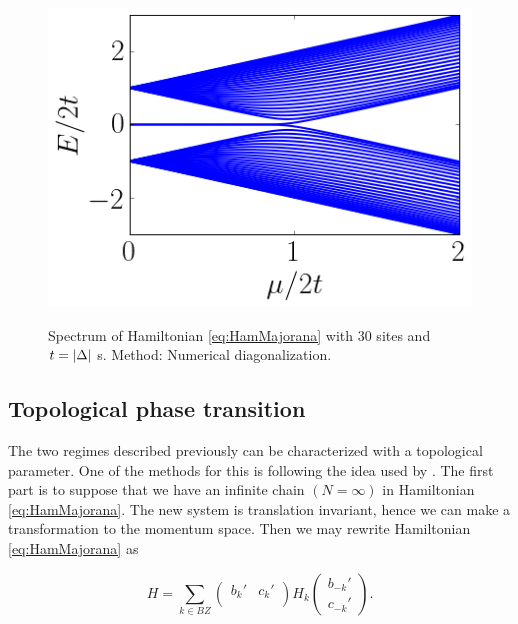 \begin{figure}[t]
    \centering
    \includegraphics[scale=0.65]{IMAGES/Majorana/Spectrum.png}
    \label{fig:KitaevSpec}
    \caption{Spectrum of Hamiltonian \eqref{eq:HamMajorana} with $30$ sites and $t=\vert \Delta \vert$ s. Method: Numerical diagonalization. \protect {} }
\end{figure}



\subsection{Topological phase transition}

The two regimes described previously  can be characterized with a topological parameter.  One of the methods for this is following the idea used by \citeauthor{alicea_new_2012}\cite{alicea_new_2012}. The first part is to suppose that we have an infinite chain $(N=\infty)$ in Hamiltonian \eqref{eq:HamMajorana}. The new system is translation invariant, hence we can make a transformation to the momentum space. Then we may rewrite Hamiltonian \eqref{eq:HamMajorana}  as

\begin{equation}
    H = 
    \sum_{k \in BZ} 
    \begin{pmatrix} 
      b_k'  & c_{k}'\\  
    \end{pmatrix}
    H_k 
    \begin{pmatrix} 
      b_{-k}'     \\ 
      c_{-k}' 
    \end{pmatrix}.
    \label{PBCHam2}
\end{equation}

